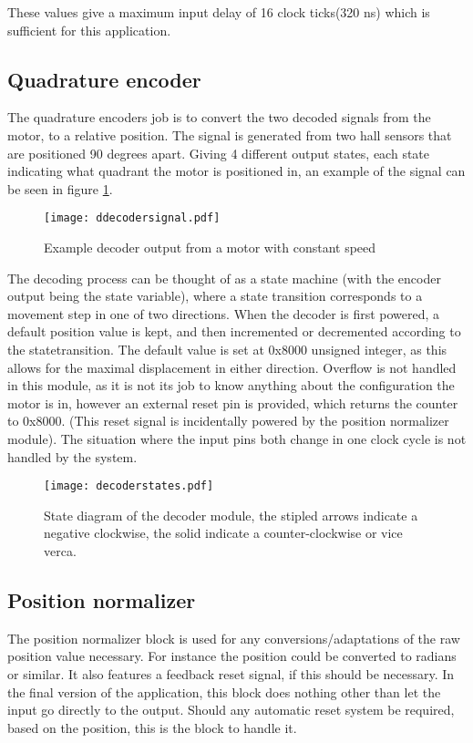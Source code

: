 These values give a maximum input delay of 16 clock ticks(320 ns) which is sufficient for this application.

\subsection{Quadrature encoder}
The quadrature encoders job is to convert the two decoded signals from the motor, to a relative position. The signal is generated from two hall sensors that are positioned 90 degrees apart. Giving 4 different output states, each state indicating what quadrant the motor is positioned in, an example of the signal can be seen in figure \ref{fig:decodersignal}.
\begin{figure}[htb]
\centering
\texttt{[image: ddecodersignal.pdf]}
\caption{Example decoder output from a motor with constant speed}
\label{fig:decodersignal}
\end{figure}
The decoding process can be thought of as a state machine (with the encoder output being the state variable), where a state transition corresponds to a movement step in one of two directions.
When the decoder is first powered, a default position value is kept, and then incremented or decremented according to the statetransition. The default value is set at 0x8000 unsigned integer, as this allows for the maximal displacement in either direction. 
Overflow is not handled in this module, as it is not its job to know anything about the configuration the motor is in, however an external reset pin is provided, which returns the counter to 0x8000. (This reset signal is incidentally powered by the position normalizer module).
The situation where the input pins both change in one clock cycle is not handled by the system.

\begin{figure}[htb]
\centering
\texttt{[image: decoderstates.pdf]}
\caption{State diagram of the decoder module, the stipled arrows indicate a negative clockwise, the solid indicate a counter-clockwise or vice verca.}
\label{fig:decoderstate}
\end{figure}

\subsection{Position normalizer}
The position normalizer block is used for any conversions/adaptations of the raw position value necessary. For instance the position could be converted to radians or similar. It also features a feedback reset signal, if this should be necessary. 
In the final version of the application, this block does nothing other than let the input go directly to the output.
Should any automatic reset system be required, based on the position, this is the block to handle it.

